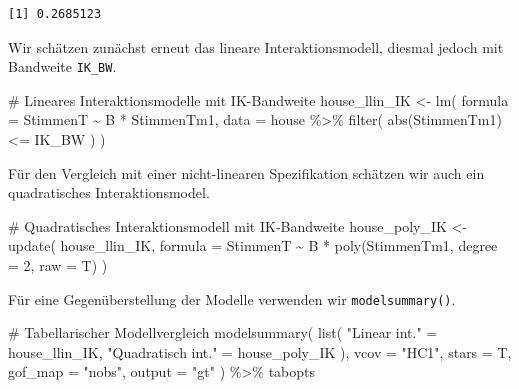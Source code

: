 \documentclass[
  a4paper,
  DIV=11,
  oneside]{scrreprt}
\newenvironment{Shaded}{\begin{snugshade}}{\end{snugshade}}
\newcommand{\AttributeTok}[1]{\textcolor[rgb]{0.40,0.45,0.13}{#1}}
\newcommand{\CommentTok}[1]{\textcolor[rgb]{0.37,0.37,0.37}{#1}}
\newcommand{\DecValTok}[1]{\textcolor[rgb]{0.68,0.00,0.00}{#1}}
\newcommand{\FunctionTok}[1]{\textcolor[rgb]{0.28,0.35,0.67}{#1}}
\newcommand{\NormalTok}[1]{\textcolor[rgb]{0.00,0.23,0.31}{#1}}
\newcommand{\OtherTok}[1]{\textcolor[rgb]{0.00,0.23,0.31}{#1}}
\newcommand{\SpecialCharTok}[1]{\textcolor[rgb]{0.37,0.37,0.37}{#1}}
\newcommand{\StringTok}[1]{\textcolor[rgb]{0.13,0.47,0.30}{#1}}
\begin{document}
\begin{verbatim}
[1] 0.2685123
\end{verbatim}

Wir schätzen zunächst erneut das lineare Interaktionsmodell, diesmal
jedoch mit Bandweite \texttt{IK\_BW}.

\begin{Shaded}
\begin{Highlighting}[]
\CommentTok{\# Lineares Interaktionsmodelle mit IK{-}Bandweite}
\NormalTok{house\_llin\_IK }\OtherTok{\textless{}{-}} \FunctionTok{lm}\NormalTok{(}
  \AttributeTok{formula =}\NormalTok{ StimmenT }\SpecialCharTok{\textasciitilde{}}\NormalTok{ B }\SpecialCharTok{*}\NormalTok{ StimmenTm1, }
  \AttributeTok{data =}\NormalTok{ house }\SpecialCharTok{\%\textgreater{}\%} 
    \FunctionTok{filter}\NormalTok{(}
      \FunctionTok{abs}\NormalTok{(StimmenTm1) }\SpecialCharTok{\textless{}=}\NormalTok{ IK\_BW}
\NormalTok{    )}
\NormalTok{)}
\end{Highlighting}
\end{Shaded}

Für den Vergleich mit einer nicht-linearen Spezifikation schätzen wir
auch ein quadratisches Interaktionsmodel.

\begin{Shaded}
\begin{Highlighting}[]
\CommentTok{\# Quadratisches Interaktionsmodell mit IK{-}Bandweite}
\NormalTok{house\_poly\_IK }\OtherTok{\textless{}{-}} \FunctionTok{update}\NormalTok{(}
\NormalTok{  house\_llin\_IK,}
  \AttributeTok{formula =}\NormalTok{ StimmenT }\SpecialCharTok{\textasciitilde{}}\NormalTok{ B }\SpecialCharTok{*} \FunctionTok{poly}\NormalTok{(StimmenTm1, }\AttributeTok{degree =} \DecValTok{2}\NormalTok{, }\AttributeTok{raw =}\NormalTok{ T)}
\NormalTok{)}
\end{Highlighting}
\end{Shaded}

Für eine Gegenüberstellung der Modelle verwenden wir
\texttt{modelsummary()}.

\begin{Shaded}
\begin{Highlighting}[]
\CommentTok{\# Tabellarischer Modellvergleich}
\FunctionTok{modelsummary}\NormalTok{(}
  \FunctionTok{list}\NormalTok{(}
    \StringTok{"Linear int."} \OtherTok{=}\NormalTok{ house\_llin\_IK, }
    \StringTok{"Quadratisch int."} \OtherTok{=}\NormalTok{ house\_poly\_IK}
\NormalTok{  ),  }
  \AttributeTok{vcov =} \StringTok{"HC1"}\NormalTok{, }
  \AttributeTok{stars =}\NormalTok{ T,}
  \AttributeTok{gof\_map =} \StringTok{"nobs"}\NormalTok{, }
  \AttributeTok{output =} \StringTok{"gt"}
\NormalTok{  ) }\SpecialCharTok{\%\textgreater{}\%} 
\NormalTok{  tabopts}
\end{Highlighting}
\end{Shaded}
\end{document}
